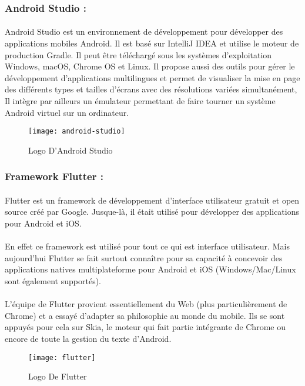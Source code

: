 \documentclass[12pt, openany]{report}
\begin{document}
\subsubsection{ \large Android Studio :}
\paragraph{}Android Studio est un environnement de développement pour développer des applications mobiles Android. Il est basé sur IntelliJ IDEA et utilise le moteur de production Gradle. Il peut être téléchargé sous les systèmes d'exploitation Windows, macOS, Chrome OS et Linux.
Il propose aussi des outils pour gérer le développement d’applications multilingues et permet de visualiser la mise en page des différents types et tailles d’écrans avec des résolutions variées simultanément, Il intègre par ailleurs un émulateur permettant de faire tourner un système Android virtuel sur un ordinateur. \\[0.3cm]
\begin{figure}[!h]
	\centering
	\texttt{[image: android-studio]}
	\caption{Logo D'Android Studio}
	\label{fig:android-studio}
\end{figure}
\subsubsection{ \large Framework Flutter :}
\paragraph{} Flutter est un framework de développement d'interface utilisateur gratuit et open source créé par Google. Jusque-là, il était utilisé pour développer des applications pour Android et iOS.
\paragraph{}En effet ce framework est utilisé pour tout ce qui est interface utilisateur. Mais aujourd’hui Flutter se fait surtout connaître pour sa capacité à concevoir des applications natives multiplateforme pour Android et iOS (Windows/Mac/Linux sont également supportés).
\paragraph{} L’équipe de Flutter provient essentiellement du Web (plus particulièrement de Chrome) et a essayé d’adapter sa philosophie au monde du mobile. Ils se sont appuyés pour cela sur Skia, le moteur qui fait partie intégrante de Chrome ou encore de toute la gestion du texte d’Android. \\[0.3cm]
\begin{figure}[!h]
	\centering
	\texttt{[image: flutter]}
	\caption{Logo De Flutter}
	\label{fig:flutter}
\end{figure}
\end{document}
